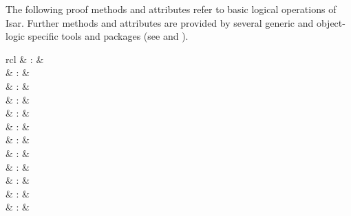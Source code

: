 \begin{isabellebody}
\begin{isamarkuptext}
\begin{description}
  \end{description}%
\end{isamarkuptext}%
\isamarkuptrue%
%
\isamarkuptrue%
%
\begin{isamarkuptext}%
The following proof methods and attributes refer to basic logical
  operations of Isar.  Further methods and attributes are provided by
  several generic and object-logic specific tools and packages (see
   and ).

  \begin{matharray}{rcl}
    \hypertarget{method.-}{\hyperlink{method.-}{\mbox{\isa{{\isacharminus}}}}} & : &  \\
    \hypertarget{method.fact}{\hyperlink{method.fact}{\mbox{}}} & : &  \\
    \hypertarget{method.assumption}{\hyperlink{method.assumption}{\mbox{}}} & : &  \\
    \hypertarget{method.this}{\hyperlink{method.this}{\mbox{}}} & : &  \\
    \hypertarget{method.rule}{\hyperlink{method.rule}{\mbox{}}} & : &  \\
    \hypertarget{attribute.Pure.intro}{\hyperlink{attribute.Pure.intro}{\mbox{}}} & : &  \\
    \hypertarget{attribute.Pure.elim}{\hyperlink{attribute.Pure.elim}{\mbox{}}} & : &  \\
    \hypertarget{attribute.Pure.dest}{\hyperlink{attribute.Pure.dest}{\mbox{}}} & : &  \\
    \hypertarget{attribute.rule}{\hyperlink{attribute.rule}{\mbox{}}} & : &  \\[0.5ex]
    \hypertarget{attribute.OF}{\hyperlink{attribute.OF}{\mbox{}}} & : &  \\
    \hypertarget{attribute.of}{\hyperlink{attribute.of}{\mbox{}}} & : &  \\
    \hypertarget{attribute.where}{\hyperlink{attribute.where}{\mbox{}}} & : &  \\
  \end{matharray}


\end{isamarkuptext}
\end{isabellebody}
